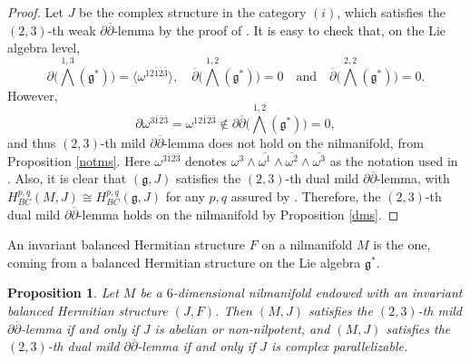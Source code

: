 \documentclass[12pt]{amsart}
\numberwithin{equation}{section}
\newtheorem{proposition}[theorem]{Proposition}
\renewcommand{\1}{\mathds{1}}
\newcommand{\db}{\overline{\partial}}
\renewcommand{\>}{\rightarrow}
\newcommand{\p}{\partial}
\def\p{\partial}
\def\b{\bar}
\begin{document}
\begin{proof}
Let $J$ be the complex structure in the category $(i)$, which
satisfies the $(2,3)$-th weak $\p\db$-lemma by the proof of
\cite[Proposition 3.6]{UV}. It is easy to check that, on the Lie
algebra level,
\[\p \big( \bigwedge^{1,3}(\mathfrak{g}^*)\big) = \langle \omega^{12\b{1}\b{2}\b{3}} \rangle,\quad
\db \big( \bigwedge^{1,2}(\mathfrak{g}^*) \big)=0\quad \text{and}
\quad \db \big( \bigwedge^{2,2}(\mathfrak{g}^*) \big)=0.\] However,
\[ \p \omega^{3\b{1}\b{2}\b{3}} = \omega^{12\b{1}\b{2}\b{3}} \notin
\p \db \big( \bigwedge^{1,2}(\mathfrak{g}^*) \big)=0,\] and thus
$(2,3)$-th mild $\p\db$-lemma does not hold on the nilmanifold, from
Proposition \ref{notms}. Here $\omega^{3\b{1}\b{2}\b{3}}$ denotes
$\omega^3 \wedge \overline{\omega^1} \wedge \overline{\omega^2}
\wedge \overline{\omega^3}$ as the notation used in \cite{UV}. Also,
it is clear that $(\mathfrak{g},J)$ satisfies the $(2,3)$-th dual
mild $\p\db$-lemma, with $H^{p,q}_{BC}(M,J) \cong
H^{p,q}_{BC}(\mathfrak{g},J)$ for any $p,q$ assured by \cite[Theorem
3.8]{A}. Therefore, the $(2,3)$-th dual mild $\p\db$-lemma holds on
the nilmanifold by Proposition \ref{dms}.
\end{proof}

An invariant balanced Hermitian structure $F$ on a nilmanifold $M$
is the one, coming from a balanced Hermitian structure on the Lie
algebra $\mathfrak{g}^*$.




\begin{proposition}\label{ex-3dim}
Let $M$ be a $6$-dimensional nilmanifold endowed with an invariant
balanced Hermitian structure $(J,F)$. Then $(M,J)$ satisfies the
$(2,3)$-th mild $\p\db$-lemma if and only if $J$ is abelian or
non-nilpotent, and $(M,J)$ satisfies the $(2,3)$-th dual mild
$\p\db$-lemma if and only if $J$ is complex parallelizable.
\end{proposition}
\end{document}
